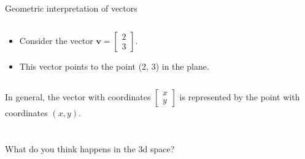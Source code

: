\documentclass{beamer}
\begin{document}
\begin{frame}{Geometric interpretation of vectors}
  \begin{example}
    \begin{columns}
      \begin{column}{0.5\textwidth}
        \begin{itemize}
          \item Consider the vector $\mathbf{v} = \begin{bmatrix} 2 \\ 3 \end{bmatrix}$.
          \item This vector points to the point (2, 3) in the plane.
        \end{itemize}
      \end{column}
      \begin{column}{0.5\textwidth}
        \begin{center}
        \end{center}
      \end{column}
    \end{columns}
  \end{example}

  In general, the vector with coordinates $\begin{bmatrix}
      x\\y
  \end{bmatrix}$ is represented by the point with coordinates $(x,y)$.\\
  \\
  \\
\pause What do you think happens in the 3d space?

  \end{frame}
\end{document}
